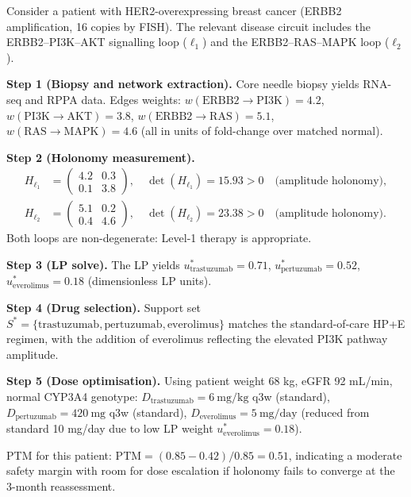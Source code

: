 \begin{example}
\label{ex:ch10-her2-protocol}
Consider a patient with HER2-overexpressing breast cancer (ERBB2 amplification,
16 copies by FISH).  The relevant disease circuit includes the ERBB2--PI3K--AKT
signalling loop ($\ell_1$) and the ERBB2--RAS--MAPK loop ($\ell_2$).

\medskip
\noindent \textbf{Step 1 (Biopsy and network extraction).}  Core needle biopsy
yields RNA-seq and RPPA data.  Edges weights: $w(\mathrm{ERBB2 \to PI3K}) =
4.2$, $w(\mathrm{PI3K \to AKT}) = 3.8$, $w(\mathrm{ERBB2 \to RAS}) = 5.1$,
$w(\mathrm{RAS \to MAPK}) = 4.6$ (all in units of fold-change over matched
normal).

\medskip
\noindent \textbf{Step 2 (Holonomy measurement).}
\begin{align*}
  H_{\ell_1} &= \begin{pmatrix} 4.2 & 0.3 \\ 0.1 & 3.8 \end{pmatrix},
  \quad \det(H_{\ell_1}) = 15.93 > 0 \quad\text{(amplitude holonomy)}, \\
  H_{\ell_2} &= \begin{pmatrix} 5.1 & 0.2 \\ 0.4 & 4.6 \end{pmatrix},
  \quad \det(H_{\ell_2}) = 23.38 > 0 \quad\text{(amplitude holonomy)}.
\end{align*}
Both loops are non-degenerate: Level-1 therapy is appropriate.

\medskip
\noindent \textbf{Step 3 (LP solve).}  The LP yields $u^*_{\mathrm{trastuzumab}} = 0.71$,
$u^*_{\mathrm{pertuzumab}} = 0.52$, $u^*_{\mathrm{everolimus}} = 0.18$
(dimensionless LP units).

\medskip
\noindent \textbf{Step 4 (Drug selection).}  Support set $S^* = \{\mathrm{trastuzumab},
\mathrm{pertuzumab}, \mathrm{everolimus}\}$ matches the standard-of-care
HP+E regimen, with the addition of everolimus reflecting the elevated PI3K
pathway amplitude.

\medskip
\noindent \textbf{Step 5 (Dose optimisation).}  Using patient weight 68 kg,
eGFR 92 mL/min, normal CYP3A4 genotype:
$D_{\mathrm{trastuzumab}} = 6\ \mathrm{mg/kg}$ q3w (standard),
$D_{\mathrm{pertuzumab}} = 420\ \mathrm{mg}$ q3w (standard),
$D_{\mathrm{everolimus}} = 5\ \mathrm{mg/day}$ (reduced from standard 10 mg/day
due to low LP weight $u^*_{\mathrm{everolimus}} = 0.18$).

PTM for this patient: $\mathrm{PTM} = (0.85 - 0.42)/0.85 = 0.51$, indicating
a moderate safety margin with room for dose escalation if holonomy fails to
converge at the 3-month reassessment.
\end{example}

